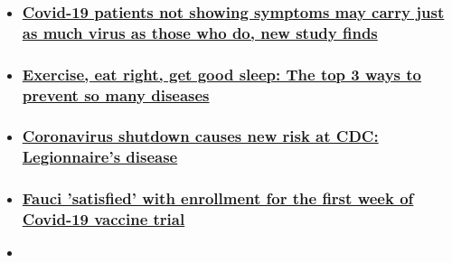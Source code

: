\begin{itemize}
\item
  \hypertarget{covid-19-patients-not-showing-symptoms-may-carry-just-as-much-virus-as-those-who-do-new-study-finds}{%
  \subsubsection{\texorpdfstring{\href{/2020/08/07/health/covid-asymptomatic-transmission-study-wellness/index.html}{Covid-19
  patients not showing symptoms may carry just as much virus as those
  who do, new study
  finds}}{Covid-19 patients not showing symptoms may carry just as much virus as those who do, new study finds}}\label{covid-19-patients-not-showing-symptoms-may-carry-just-as-much-virus-as-those-who-do-new-study-finds}}
\item
  \hypertarget{exercise-eat-right-get-good-sleep-the-top-3-ways-to-prevent-so-many-diseases}{%
  \subsubsection{\texorpdfstring{\href{/2020/08/07/health/exercise-sleep-prevent-disease-wellness/index.html}{Exercise,
  eat right, get good sleep: The top 3 ways to prevent so many
  diseases}}{Exercise, eat right, get good sleep: The top 3 ways to prevent so many diseases}}\label{exercise-eat-right-get-good-sleep-the-top-3-ways-to-prevent-so-many-diseases}}
\item
  \hypertarget{coronavirus-shutdown-causes-new-risk-at-cdc-legionnaires-disease-}{%
  \subsubsection{\texorpdfstring{\href{/2020/08/07/health/coronavirus-legionnaires-water-cdc/index.html}{Coronavirus
  shutdown causes new risk at CDC: Legionnaire's disease
  }}{Coronavirus shutdown causes new risk at CDC: Legionnaire's disease }}\label{coronavirus-shutdown-causes-new-risk-at-cdc-legionnaires-disease-}}
\item
  \hypertarget{fauci-satisfied-with-enrollment-for-the-first-week-of-covid-19-vaccine-trial-}{%
  \subsubsection{\texorpdfstring{\href{/2020/08/06/health/coronavirus-moderna-volunteers-fauci-satisfied/index.html}{Fauci
  'satisfied' with enrollment for the first week of Covid-19 vaccine
  trial
  }}{Fauci 'satisfied' with enrollment for the first week of Covid-19 vaccine trial }}\label{fauci-satisfied-with-enrollment-for-the-first-week-of-covid-19-vaccine-trial-}}
\item
  \hypertarget{model-projects-nearly-300000-americans-could-die-from-covid-19-by-december}{%
}
\end{itemize}
